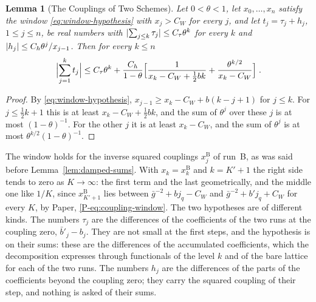 \documentclass[11pt]{preprint}
\DeclarePairedDelimiter{\abs}{\lvert}{\rvert}
\numberwithin{equation}{section}
\newtheorem{lemma}[theorem]{Lemma}
\theoremstyle{definition}
\theoremstyle{remark}
\theoremstyle{plain}
\begin{document}
\begin{lemma}[The Couplings of Two Schemes]\label{lem:scheme-coupling}
Let $0 < \theta < 1$, let $x_0, \dots, x_n$ satisfy the window \eqref{eq:window-hypothesis} with $x_j > C_W$ for every $j$, and let $t_j = \tau_j + h_j$, $1 \leq j \leq n$, be real numbers with $\abs{\sum_{j \leq k}\tau_j} \leq C_\tau\theta^k$ for every $k$ and $\abs{h_j} \leq C_h\theta^j/x_{j-1}$. Then for every $k \leq n$
\begin{equation}\label{eq:scheme-coupling}
    \Bigl\lvert\sum_{j=1}^{k}t_j\Bigr\rvert \leq C_\tau\theta^k + \frac{C_h}{1 - \theta}\Bigl[\frac{1}{x_k - C_W + \frac12bk} + \frac{\theta^{k/2}}{x_k - C_W}\Bigr]\;.
\end{equation}
\end{lemma}

\begin{proof}
By \eqref{eq:window-hypothesis}, $x_{j-1} \geq x_k - C_W + b(k - j + 1)$ for $j \leq k$. For $j \leq \frac12k + 1$ this is at least $x_k - C_W + \frac12bk$, and the sum of $\theta^j$ over these $j$ is at most $(1 - \theta)^{-1}$. For the other $j$ it is at least $x_k - C_W$, and the sum of $\theta^j$ is at most $\theta^{k/2}(1 - \theta)^{-1}$.
\end{proof}

The window holds for the inverse squared couplings $x^{\mathrm B}_j$ of run~B, as was said before Lemma~\ref{lem:damped-sums}. With $x_k = x^{\mathrm B}_k$ and $k = K' + 1$ the right side tends to zero as $K \to \infty$: the first term and the last geometrically, and the middle one like $1/K$, since $x^{\mathrm B}_{K'+1}$ lies between $\bar g^{-2} + bj_q - C_W$ and $\bar g^{-2} + b'j_q + C_W$ for every $K$, by Paper, \eqref{P-eq:coupling-window}. The two hypotheses are of different kinds. The numbers $\tau_j$ are the differences of the coefficients of the two runs at the coupling zero, $\bar b'_j - b_j$. They are not small at the first steps, and the hypothesis is on their sums: these are the differences of the accumulated coefficients, which the decomposition expresses through functionals of the level $k$ and of the bare lattice for each of the two runs. The numbers $h_j$ are the differences of the parts of the coefficients beyond the coupling zero; they carry the squared coupling of their step, and nothing is asked of their sums.
\end{document}
